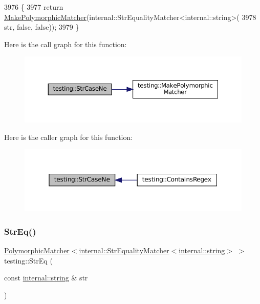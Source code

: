 \begin{DoxyCode}
3976                                          \{
3977   \textcolor{keywordflow}{return} \hyperlink{namespacetesting_a667ca94f190ec2e17ee2fbfdb7d3da04}{MakePolymorphicMatcher}(internal::StrEqualityMatcher<internal::string>(
3978       str, \textcolor{keyword}{false}, \textcolor{keyword}{false}));
3979 \}
\end{DoxyCode}
Here is the call graph for this function\+:
\nopagebreak
\begin{figure}[H]
\begin{center}
\leavevmode
\includegraphics[width=350pt]{namespacetesting_a9596fd67bdd5df195bc54382f91a1906_cgraph}
\end{center}
\end{figure}
Here is the caller graph for this function\+:
\nopagebreak
\begin{figure}[H]
\begin{center}
\leavevmode
\includegraphics[width=350pt]{namespacetesting_a9596fd67bdd5df195bc54382f91a1906_icgraph}
\end{center}
\end{figure}
\mbox{\label{namespacetesting_a154de81376ae7d584c6e5a619b45fb09}} 
\subsubsection{\texorpdfstring{Str\+Eq()}{StrEq()}}
{\footnotesize\ttfamily \hyperlink{classtesting_1_1PolymorphicMatcher}{Polymorphic\+Matcher}$<$\hyperlink{classtesting_1_1internal_1_1StrEqualityMatcher}{internal\+::\+Str\+Equality\+Matcher}$<$\hyperlink{namespacetesting_1_1internal_a8e8ff5b11e64078831112677156cb111}{internal\+::string}$>$ $>$ testing\+::\+Str\+Eq (\begin{DoxyParamCaption}\item[{const \hyperlink{namespacetesting_1_1internal_a8e8ff5b11e64078831112677156cb111}{internal\+::string} \&}]{str }\end{DoxyParamCaption})\hspace{0.3cm}{\ttfamily [inline]}}



